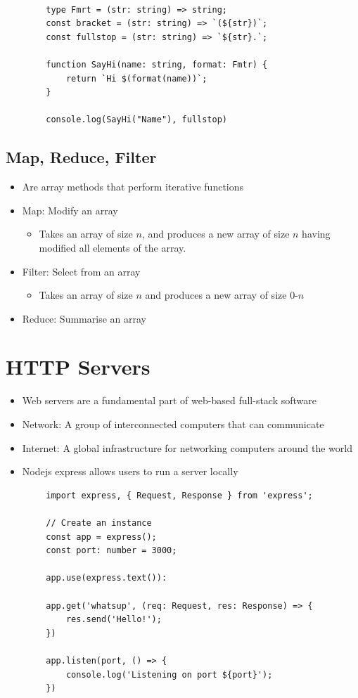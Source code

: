 \documentclass{report}
\begin{document}
	\begin{verbatim}

		type Fmrt = (str: string) => string;
		const bracket = (str: string) => `(${str})`;
		const fullstop = (str: string) => `${str}.`;

		function SayHi(name: string, format: Fmtr) {
			return `Hi $(format(name))`;
		}

		console.log(SayHi("Name"), fullstop)
	\end{verbatim}

	\section{Map, Reduce, Filter}

		\begin{itemize}
			\item Are array methods that perform iterative functions
			\item Map: Modify an array
				\begin{itemize}
					\item Takes an array of size $n$, and produces a new array of size $n$ having modified all elements of the array.
				\end{itemize}
			\item Filter: Select from an array
				\begin{itemize}
					\item Takes an array of size $n$ and produces a new array of size 0-$n$
				\end{itemize}
			\item Reduce: Summarise an array
		\end{itemize}

\chapter{HTTP Servers}

	\begin{itemize}
		\item Web servers are a fundamental part of web-based full-stack software
		\item Network: A group of interconnected computers that can communicate
		\item Internet: A global infrastructure for networking computers around the world
		\item Nodejs express allows users to run a server locally
	\end{itemize}

	\begin{verbatim}
		import express, { Request, Response } from 'express';

		// Create an instance
		const app = express();
		const port: number = 3000;

		app.use(express.text()):

		app.get('whatsup', (req: Request, res: Response) => {
			res.send('Hello!');
		})

		app.listen(port, () => {
			console.log('Listening on port ${port}');
		})
	\end{verbatim}
\end{document}
